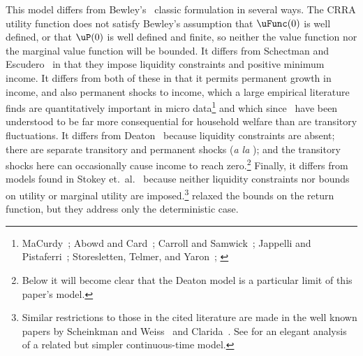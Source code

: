 \documentclass[./BufferStockTheory.tex]{subfiles}
\begin{document}
\begin{comment}
Combining the transition equations, the recursive nature of
the problem allows us to rewrite it more compactly in Bellman equation form,
\begin{align*}
\VFunc_{t}(\mLevBF_{t},\pLevBF_{t})  & = \max_{\cLevBF_{t}}~\left\{\uFunc(\cLevBF_{t})+\DiscFac \Ex_{t}\left[ \VFunc_{t+1}((\mLevBF_{t}-\cLevBF_{t})\Rfree+ \pLevBF_{t+1}\tShkAll_{t+1},\pLevBF_{t} \PGro  \pShk_{t+1})\right]\right\}
.
\end{align*}
\end{comment}

\hypertarget{DiffWithLit}{} This model differs from Bewley's~\citeyearpar{bewleyPIH} classic formulation in several ways. The CRRA utility function does not satisfy Bewley's assumption that $\uFunc(0)$ is well defined, or that $\uP(0)$ is well defined and finite, so neither the value function nor the marginal value function will be bounded.  It differs from Schectman and Escudero~\citeyearpar{seIncFluct} in that they impose liquidity constraints and positive minimum income.  It differs from both of these in that it permits permanent growth in income, and also permanent shocks to income, which a large empirical literature finds are quantitatively important in micro data\footnote{MaCurdy~\citeyearpar{macurdyTimeseries}; Abowd and Card~\citeyearpar{acCovariance}; Carroll and Samwick~\citeyearpar{csNature}; Jappelli and Pistaferri~\citeyearpar{jpCins}; Storesletten, Telmer, and Yaron~\citeyearpar{styConsumption}; \cite{blpRisk}} and which since~\cite{friedmanATheory} have been understood to be far more consequential for household welfare than are transitory fluctuations.  It differs from Deaton~\citeyearpar{deatonLiqConstr} because liquidity constraints are absent; there are separate transitory and permanent shocks ({\it a la} \cite{muthOptimal}); and the transitory shocks here can occasionally cause income to reach zero.\footnote{Below it will become clear that the Deaton model is a particular limit of this paper's model.}  Finally, it differs from models found in Stokey et.\ al.~\citeyearpar{slpMethods} because neither liquidity constraints nor bounds on utility or marginal utility are imposed.\footnote{Similar restrictions to those in the cited literature are made in the well known papers by Scheinkman and Weiss~\citeyearpar{scheinkman&weiss:borrowing} and Clarida~\citeyearpar{claridaErgodic}.  See \cite{tocheUrisk} for an elegant analysis of a related but simpler continuous-time model.}  \cite{asHomogeneous} relaxed the bounds on the return function, but they address only the deterministic case.
\end{document}
